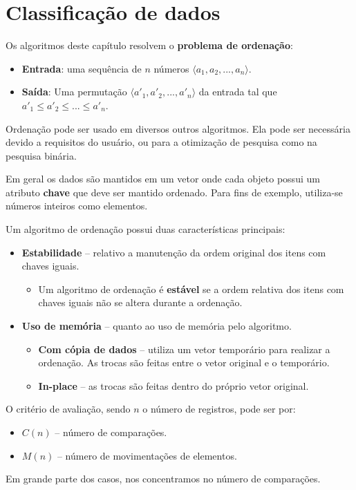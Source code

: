 \chapter{Classificação de dados}

Os algoritmos deste capítulo resolvem o {\bf problema de ordenação}:
\begin{itemize}
\item {\bf Entrada}: uma sequência de $n$ números $\langle a_1, a_2, ..., a_n \rangle$.

\item {\bf Saída}:  Uma permutação $\langle {a'}_1, {a'}_2, ..., {a'}_n \rangle$ da
entrada tal que ${a'}_1 \leq {a'}_2 \leq ... \leq {a'}_n$.
\end{itemize}
Ordenação pode ser usado em diversos outros algoritmos.
Ela pode ser necessária devido a requisitos do usuário, ou para a otimização de pesquisa 
como na pesquisa binária.

Em geral os dados são mantidos em um vetor onde cada objeto possui um
atributo \textbf{chave} que deve ser mantido ordenado.
Para fins de exemplo, utiliza-se números inteiros como elementos.

Um algoritmo de ordenação possui duas características principais:
\begin{itemize}
\item {\bf Estabilidade} -- relativo a manutenção da ordem original dos itens 
com chaves iguais.
	\begin{itemize}
	\item Um algoritmo de ordenação é {\bf estável} se a ordem relativa dos itens
		com chaves iguais não se altera durante a ordenação.
	\end{itemize}
\item {\bf Uso de memória} -- quanto ao uso de memória pelo algoritmo.
	\begin{itemize}
	\item {\bf Com cópia de dados} -- utiliza um vetor temporário para realizar a ordenação. As trocas são feitas entre o vetor original e o temporário.
	\item {\bf In-place} -- as trocas são feitas dentro do próprio vetor original.
	\end{itemize}
\end{itemize}

O critério de avaliação, sendo $n$ o número de registros, pode ser por:
\begin{itemize}
\item $C(n)$ -- número de comparações.
\item $M(n)$ -- número de movimentações de elementos.
\end{itemize}
Em grande parte dos casos, nos concentramos no número de comparações.

